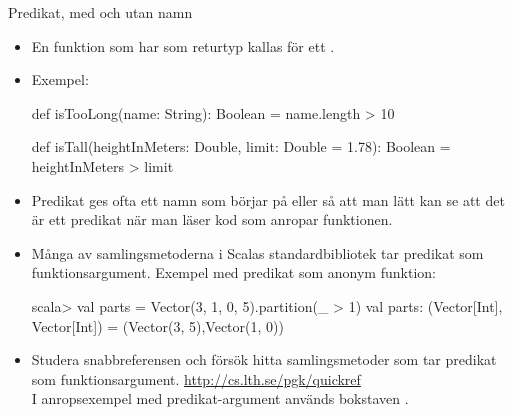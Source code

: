 \begin{Slide}{Predikat, med och utan namn}
\begin{itemize}\SlideFontSmall
\item En funktion som har  som returtyp kallas för ett . 
\item Exempel:
\begin{Code}
def isTooLong(name: String): Boolean = name.length > 10

def isTall(heightInMeters: Double, limit: Double = 1.78): Boolean = 
  heightInMeters > limit
\end{Code}
\item Predikat ges ofta ett namn som börjar på  eller  så att man lätt kan se att det är ett predikat när man läser kod som anropar funktionen.
\item Många av samlingsmetoderna i Scalas standardbibliotek tar predikat som funktionsargument. Exempel med predikat som anonym funktion: 
\begin{REPLnonum}
scala> val parts = Vector(3, 1, 0, 5).partition(_ > 1)
val parts: (Vector[Int], Vector[Int]) = 
  (Vector(3, 5),Vector(1, 0))
\end{REPLnonum} 
\item Studera snabbreferensen och försök hitta samlingsmetoder som tar predikat som funktionsargument. \url{http://cs.lth.se/pgk/quickref} \\I anropsexempel med predikat-argument används bokstaven .
\end{itemize}  
\end{Slide}

